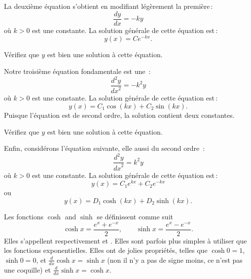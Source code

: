 \medskip

La deuxième équation s'obtient en modifiant légèrement
 la première\,: 
\begin{equation*}
\frac{dy}{dx} = -k y 
\end{equation*}
o\`u $k > 0$ est une constante.
La solution g\'en\'erale de cette \'equation est\,: 
\begin{equation*}
y(x) = C e^{-kx} .
\end{equation*}

\begin{exercise}
V\'erifiez que $y$ est bien une solution \`a cette \'equation.
\end{exercise}

Notre troisi\`eme \'equation fondamentale est une 
\emph{}\,: 
\begin{equation*}
\frac{d^2y}{{dx}^2} = -k^2 y 
\end{equation*}
o\`u $k > 0$ est une constante.
La solution g\'en\'erale de cette \'equation est\,: 
\begin{equation*}
y(x) = C_1 \cos(kx) + C_2 \sin(kx) .
\end{equation*}
Puisque l'\'equation est de second ordre, la solution contient deux constantes.

\begin{exercise}
V\'erifiez que $y$ est bien une solution \`a cette \'equation.
\end{exercise}

Enfin, consid\'erons l'\'equation suivante, elle aussi du second ordre \,: 
\begin{equation*}
\frac{d^2y}{{dx}^2} = k^2 y 
\end{equation*}
o\`u $k > 0$ est une constante.
La solution g\'en\'erale de cette \'equation est\,: 
\begin{equation*}
y(x) = C_1 e^{kx} + C_2 e^{-kx} 
\end{equation*}
ou
\begin{equation*}
y(x) = D_1 \cosh(kx) + D_2 \sinh(kx) .
\end{equation*}

Les fonctions $\cosh$ and $\sinh$ se d\'efinissent comme suit
\begin{equation*}
\cosh x = \frac{e^{x} + e^{-x}}{2} , \qquad
\sinh x = \frac{e^{x} - e^{-x}}{2} .
\end{equation*}
Elles s'appellent respectivement 
\emph{}
et
\emph{}.
Elles sont parfois plus simples \`a utiliser que les fonctions exponentielles.  Elles ont de jolies propri\'et\'es, telles que
$\cosh 0 = 1$, $\sinh 0 = 0$, et $\frac{d}{dx} \cosh x = \sinh x$ (non il n'y a pas de signe moins, ce n'est pas une coquille)
et $\frac{d}{dx} \sinh x = \cosh x$.

